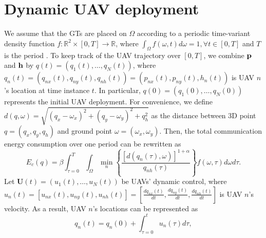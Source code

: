\documentclass[smallabstract,smallcaptions]{dccpaper}
\newcounter{example}[section]
\newcommand{\bP}{\ensuremath{\vp}}          %
\newcommand{\bQ}{\ensuremath{q}}          %
\newcommand{\bH}{\ensuremath{\vh}}          %
\begin{document}
\section{Dynamic UAV deployment}
%
%
We assume that the GTs are placed on $\Omega$ according to a periodic time-variant density function
$f:\mathbb{R}^2\times[0,T]\to\mathbb{R}$, where $\int_{\Omega}f(\omega,t)d\omega=1, \forall t\in[0,T]$ and $T$ is the
period \cite{Erdem}.  To keep track of the UAV trajectory over $[0,T]$, we combine $\bP$ and $\bH$ by
$\bQ(t)=\left(q_1(t),\dots,q_N(t)\right)$, where
$q_n(t)=\left(q_{nx}(t),q_{ny}(t),q_{nh}(t)\right)=\left(p_{nx}(t),p_{ny}(t),h_n(t)\right)$ is UAV $n$'s location at
time instance $t$.
%
%
In particular, $\bQ(0)=\left(q_1(0),\dots,q_N(0)\right)$ represents the initial UAV deployment.  For convenience, we
define $d\left(q,\omega\right)=\sqrt{\left(q_{x}-\omega_x\right)^2+\left(q_{y}-\omega_y\right)^2+q^2_{h}}$ as the
distance between 3D point $q=\left(q_x,q_y,q_h\right)$ and ground point $\omega=\left(\omega_x,\omega_y\right)$.
%
%
Then, the total communication energy consumption over one period can be rewritten as
%
\begin{equation}
E_c\left(\bQ\right)=\beta\int_{\tau=0}^{T}\int_{\Omega}\min_{n}\left\{\frac{\left[d\left(q_n(\tau),\omega\right)\right]^{1+\alpha}}{q_{nh}\left(\tau\right)}\right\}f\left(\omega,\tau\right)d\omega d\tau.
\end{equation}
%
Let $\mathbf{U}(t)=\left(u_1(t),\dots,u_N(t)\right)$ be UAVs' dynamic control, where $u_n(t)=\left[u_{nx}(t),u_{ny}(t),u_{nh}(t)\right]=\left[\frac{dq_{nx}(t)}{dt},\frac{dq_{ny}(t)}{dt},\frac{dq_{nh}(t)}{dt}\right]$ is UAV $n$'s velocity.
As a result, UAV $n$'s locations can be represented as
\begin{equation}
q_n(t) = q_n(0) + \int_{\tau=0}^{t}u_n(\tau)d\tau,
\end{equation}
\end{document}
